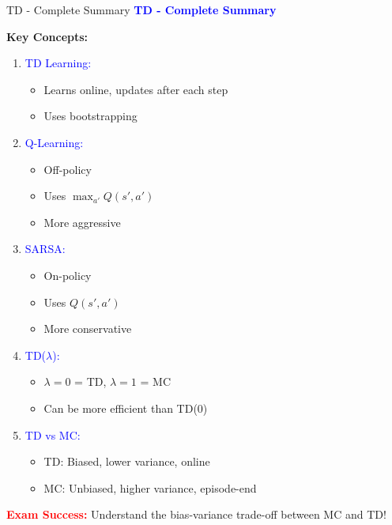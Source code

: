 \documentclass[8pt]{beamer}
\begin{document}
\begin{frame}{TD - Complete Summary}
\fontsize{6.5}{7.5}\selectfont
\textcolor{blue}{\textbf{TD - Complete Summary}}

\textbf{Key Concepts:}
\begin{enumerate}
\item \textcolor{blue}{TD Learning:}
\begin{itemize}
\item Learns online, updates after each step
\item Uses bootstrapping
\end{itemize}

\item \textcolor{blue}{Q-Learning:}
\begin{itemize}
\item Off-policy
\item Uses $\max_{a'} Q(s',a')$
\item More aggressive
\end{itemize}

\item \textcolor{blue}{SARSA:}
\begin{itemize}
\item On-policy
\item Uses $Q(s',a')$
\item More conservative
\end{itemize}

\item \textcolor{blue}{TD($\lambda$):}
\begin{itemize}
\item $\lambda=0$ = TD, $\lambda=1$ = MC
\item Can be more efficient than TD(0)
\end{itemize}

\item \textcolor{blue}{TD vs MC:}
\begin{itemize}
\item TD: Biased, lower variance, online
\item MC: Unbiased, higher variance, episode-end
\end{itemize}
\end{enumerate}

\textcolor{red}{\textbf{Exam Success:}} Understand the bias-variance trade-off between MC and TD!
\end{frame}
\end{document}

